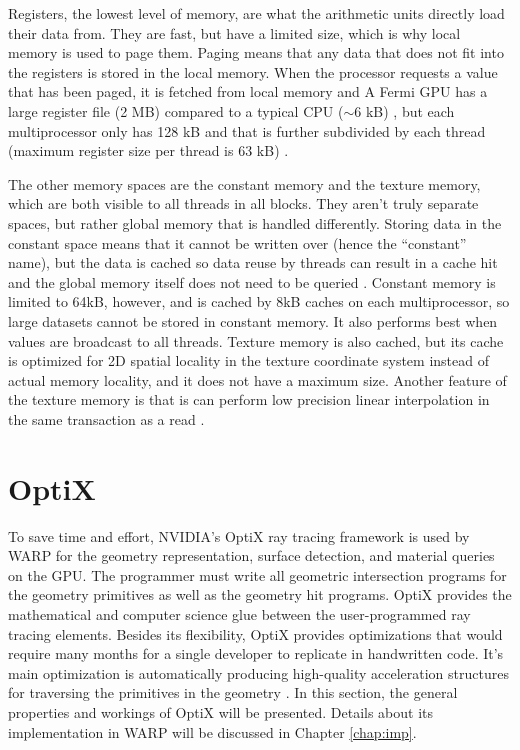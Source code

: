 Registers, the lowest level of memory, are what the arithmetic units directly load their data from.  They are fast, but have a limited size, which is why local memory is used to page them.  Paging means that any data that does not fit into the registers is stored in the local memory.  When the processor requests a value that has been paged, it is fetched from local memory and   A Fermi GPU  has a large register file (2 MB) compared to a typical CPU ($\sim$6 kB) %
, but each multiprocessor only has 128 kB and that is further subdivided by each thread (maximum register size per thread is 63 kB) \cite{fermi}.

The other memory spaces are the constant memory and the texture memory, which are both visible to all threads in all blocks.  They aren't truly separate spaces, but rather global memory that is handled differently.  Storing data in the constant space means that it cannot be written over (hence the ``constant'' name), but the data is cached so data reuse by threads can result in a cache hit and the global memory itself does not need to be queried \cite{cuda}.  Constant memory is limited to 64kB, however, and is cached by 8kB caches on each multiprocessor, so large datasets cannot be stored in constant memory.  It also performs best when values are broadcast to all threads.  Texture memory is also cached, but its cache is optimized for 2D spatial locality in the texture coordinate system instead of actual memory locality, and it does not have a maximum size.  Another feature of the texture memory is that is can perform low precision linear interpolation in the same transaction as a read \cite{cuda}.

\section{OptiX}

To save time and effort, NVIDIA's OptiX ray tracing framework is used by WARP for the geometry representation, surface detection, and material queries on the GPU.  The programmer must write all geometric intersection programs for the geometry primitives as well as the geometry hit programs.  OptiX provides the mathematical and computer science glue between the user-programmed ray tracing elements.  Besides its flexibility, OptiX provides optimizations that would require many months for a single developer to replicate in handwritten code.  It's main optimization is automatically producing high-quality acceleration structures for traversing the primitives in the geometry \cite{optix}.  In this section, the general properties and workings of OptiX will be presented.  Details about its implementation in WARP will be discussed in Chapter \ref{chap:imp}.

